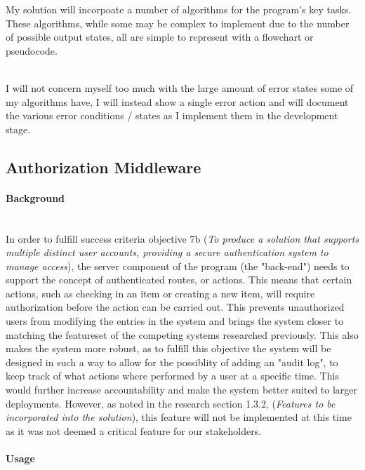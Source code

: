 \documentclass[../../main.tex]{subfiles}
\begin{document}
\noindent My solution will incorpoate a number of algorithms for the program's key tasks.
These algorithms, while some may be complex to implement due to the number of possible
output states, all are simple to represent with a flowchart or pseudocode.

\noindent \\ I will not concern myself too much with the large amount of error states some
of my algorithms have, I will instead show a single error action and will document the
various error conditions / states as I implement them in the development stage.

\subsection{Authorization Middleware}

\paragraph{Background}

\noindent \\ In order to fulfill success criteria objective 7b (\textit{To produce a solution that supports multiple
    distinct user accounts, providing a secure authentication system to manage access}), the server component of
the program (the "back-end") needs to support the concept of authenticated routes, or actions.
This means that certain actions, such as checking in an item or creating a new item, will require authorization
before the action can be carried out. This prevents unauthorized users from modifying the entries in the system
and brings the system closer to matching the featureset of the competing systems researched previously. This
also makes the system more robust, as to fulfill this objective the system will be designed in such a way
to allow for the possiblity of adding an "audit log", to keep track of what actions where performed by
a user at a specific time. This would further increase accountability and make the system better suited to larger
deployments. However, as noted in the research section 1.3.2, (\textit{Features to be incorporated into the solution}),
this feature will not be implemented at this time as it was not deemed a critical feature for our stakeholders.

\paragraph{Usage}
\end{document}
